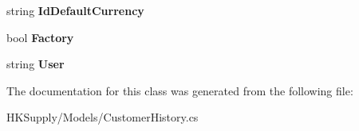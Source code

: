 \begin{DoxyCompactItemize}
\mbox{\label{class_h_k_supply_1_1_models_1_1_customer_history_acbc65c2d2e5027752fd91dfc1ec82036}} 
string {\bfseries Id\+Default\+Currency}
\item 
\mbox{\label{class_h_k_supply_1_1_models_1_1_customer_history_a83245fa9151559f396ed7c8bd59f4ca5}} 
bool {\bfseries Factory}
\item 
\mbox{\label{class_h_k_supply_1_1_models_1_1_customer_history_ae897dd3975eb0a3766e4e9ac6e2c673c}} 
string {\bfseries User}
\end{DoxyCompactItemize}


The documentation for this class was generated from the following file\+:\begin{DoxyCompactItemize}
\item 
H\+K\+Supply/\+Models/Customer\+History.\+cs\end{DoxyCompactItemize}
